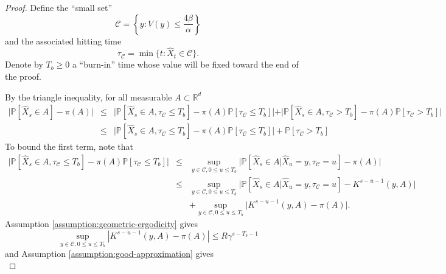 \begin{proof}
Define the ``small set'' 
\begin{equation} \label{EqSmallSet}
    \mathcal{C} = \left\{y : V(y) \leq \frac{4 \beta}{\alpha}\right\}    
\end{equation}
and the associated hitting time 
\begin{equation} \label{EqSmallSetHitting}
    \tau_{\mathcal{C}} = \min{\{t : \hat{X}_t \in \mathcal{C}\}}.
\end{equation}
Denote by $T_b \geq 0$ a ``burn-in'' time whose value will be fixed toward the end of the proof. 

By the triangle inequality, for all measurable $A \subset \mathbb{R}^{d}$
\begin{eqnarray}
\vert \mathbb{P}[\hat{X}_s \in A] - \pi(A) \vert &\leq& \vert \mathbb{P}[\hat{X}_s \in A, \tau_{\mathcal{C}} \leq T_b] - \pi(A) \mathbb{P}[\tau_{\mathcal{C}} \leq T_b] \vert \nonumber  + \vert \mathbb{P}[\hat{X}_s \in A, \tau_{\mathcal{C}} > T_b] - \pi(A) \mathbb{P}[\tau_{\mathcal{C}} > T_b] \vert \nonumber \\
&\leq& \vert \mathbb{P}[\hat{X}_s \in A, \tau_{\mathcal{C}} \leq T_b] - \pi(A) \mathbb{P}[\tau_{\mathcal{C}} \leq T_b] \vert \nonumber  + \mathbb{P}[\tau_{\mathcal{C}} > T_b] \label{eq:chain-inequality}
\end{eqnarray}
To bound the first term, note that
\begin{eqnarray}
    \vert \mathbb{P}[\hat{X}_s \in A, \tau_{\mathcal{C}} \leq T_b] - \pi(A) \mathbb{P}[\tau_{\mathcal{C}} \leq T_b] \vert \nonumber  &\leq& \sup_{y \in \mathcal{C}, 0 \leq u \leq T_b}{\vert \mathbb{P}[\hat{X}_s\in A \vert \hat{X}_u = y, \tau_{\mathcal{C}}=u] - \pi(A) \vert} \nonumber \\
    &\leq& \sup_{y \in \mathcal{C}, 0 \leq u \leq T_b}{\vert \mathbb{P}[\hat{X}_s\in A \vert \hat{X}_u = y, \tau_{\mathcal{C}}=u] - K^{s-u-1}(y, A) \vert} \nonumber \\ && + \sup_{y \in \mathcal{C}, 0 \leq u \leq T_b}{\vert K^{s-u-1}(y, A) - \pi(A) \vert}.
    \label{eq:chain-inequality-first-term}
\end{eqnarray}
Assumption \ref{assumption:geometric-ergodicity} gives 
\begin{equation*}
    \sup_{y \in \mathcal{C}, 0 \leq u \leq T_b}{\left| K^{s-u-1}(y, A) - \pi(A)\right|} \leq R \gamma^{s-T_b-1}    
\end{equation*}
and Assumption \ref{assumption:good-approximation} gives 
\begin{equation*}

\end{equation*}
\end{proof}
